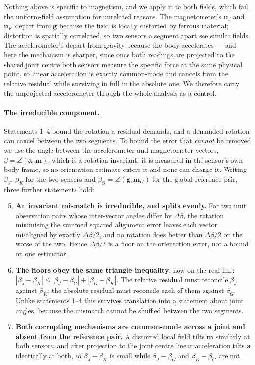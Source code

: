 Nothing above is specific to magnetism, and we apply it to both fields, which fail the
uniform-field assumption for unrelated reasons. The magnetometer's $\mathbf{u}_J$ and
$\mathbf{u}_K$ depart from $\mathbf{g}$ because the field is locally distorted by ferrous
material; distortion is spatially correlated, so two sensors a segment apart see similar fields.
The accelerometer's depart from gravity because the body accelerates --- and here the mechanism
is sharper, since once both readings are projected to the shared joint centre both sensors
measure the specific force at the same physical point, so linear acceleration is exactly
common-mode and cancels from the relative residual while surviving in full in the absolute one.
We therefore carry the unprojected accelerometer through the whole analysis as a control.

\paragraph{The irreducible component.}
Statements 1--4 bound the rotation a residual demands, and a demanded rotation can cancel
between the two segments. To bound the error that \emph{cannot} be removed we use the angle
between the accelerometer and magnetometer vectors,
$\beta = \angle(\mathbf{a}, \mathbf{m})$, which is a rotation invariant: it is measured in the
sensor's own body frame, so no orientation estimate enters it and none can change it. Writing
$\beta_J$, $\beta_K$ for the two sensors and $\beta_G = \angle(\mathbf{g}, \mathbf{m}_G)$ for
the global reference pair, three further statements hold:

\begin{enumerate}\setcounter{enumi}{4}
  \item \textbf{An invariant mismatch is irreducible, and splits evenly.} For two unit
    observation pairs whose inter-vector angles differ by $\Delta\beta$, the rotation minimising
    the summed squared alignment error leaves each vector misaligned by exactly
    $\Delta\beta/2$, and no rotation does better than $\Delta\beta/2$ on the worse of the two.
    Hence $\Delta\beta/2$ is a floor on the orientation error, not a bound on one estimator.

  \item \textbf{The floors obey the same triangle inequality}, now on the real line:
    $|\beta_J - \beta_K| \le |\beta_J - \beta_G| + |\beta_G - \beta_K|$. The relative residual
    must reconcile $\beta_J$ against $\beta_K$; the absolute residual must reconcile each of them
    against $\beta_G$. Unlike statements 1--4 this survives translation into a statement about
    joint angles, because the mismatch cannot be shuffled between the two segments.

  \item \textbf{Both corrupting mechanisms are common-mode across a joint and absent from the
    reference pair.} A distorted local field tilts $\mathbf{m}$ similarly at both sensors, and
    after projection to the joint centre linear acceleration tilts $\mathbf{a}$ identically at
    both, so $\beta_J - \beta_K$ is small while $\beta_J - \beta_G$ and $\beta_K - \beta_G$ are
    not.
\end{enumerate}

